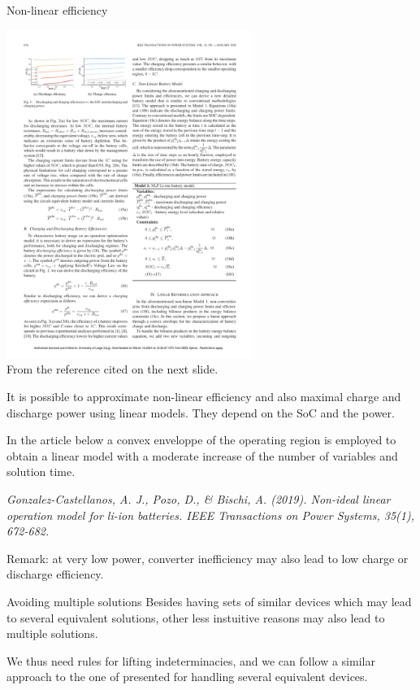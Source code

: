 \begin{frame}[allowframebreaks]{Non-linear efficiency}

    \begin{center}
        \includegraphics[width=0.6\textwidth]{images/Non-Ideal_Linear_Operation_Model_for_Li-Ion_Batteries.pdf} \\
        From the reference cited on the next slide.
    \end{center}
    
    It is possible to approximate non-linear efficiency and also maximal charge and discharge power using linear models.
    They depend on the SoC and the power. 
    
    In the article below a convex enveloppe of the operating region is employed to obtain a linear model with a moderate increase of the number of variables and solution time.

    \textit{Gonzalez-Castellanos, A. J., Pozo, D., \& Bischi, A. (2019). Non-ideal linear operation model for li-ion batteries. IEEE Transactions on Power Systems, 35(1), 672-682.}

    Remark: at very low power, converter inefficiency may also lead to low charge or discharge efficiency.
\end{frame}


\begin{frame}{Avoiding multiple solutions}
    Besides having sets of similar devices which may lead to several equivalent solutions, other less instuitive reasons may also lead to multiple solutions.

    We thus need rules for lifting indeterminacies, and we can follow a similar approach to the one of presented for handling several equivalent devices.
\end{frame}

